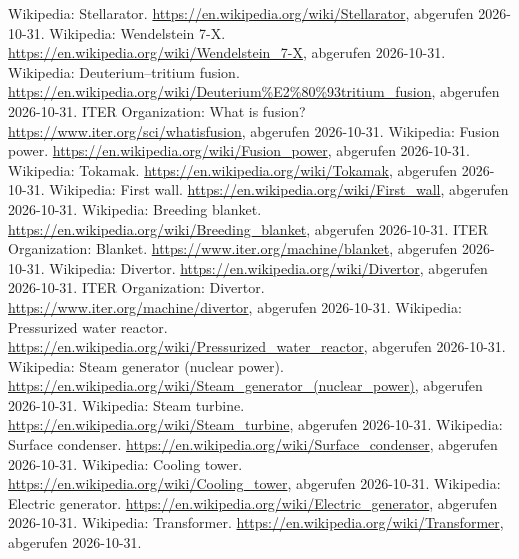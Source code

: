  Wikipedia: Stellarator. \url{https://en.wikipedia.org/wiki/Stellarator}, abgerufen 2026-10-31.
 Wikipedia: Wendelstein 7-X. \url{https://en.wikipedia.org/wiki/Wendelstein_7-X}, abgerufen 2026-10-31.
 Wikipedia: Deuterium--tritium fusion. \url{https://en.wikipedia.org/wiki/Deuterium%E2%80%93tritium_fusion}, abgerufen 2026-10-31.
 ITER Organization: What is fusion? \url{https://www.iter.org/sci/whatisfusion}, abgerufen 2026-10-31.
 Wikipedia: Fusion power. \url{https://en.wikipedia.org/wiki/Fusion_power}, abgerufen 2026-10-31.
 Wikipedia: Tokamak. \url{https://en.wikipedia.org/wiki/Tokamak}, abgerufen 2026-10-31.
 Wikipedia: First wall. \url{https://en.wikipedia.org/wiki/First_wall}, abgerufen 2026-10-31.
 Wikipedia: Breeding blanket. \url{https://en.wikipedia.org/wiki/Breeding_blanket}, abgerufen 2026-10-31.
 ITER Organization: Blanket. \url{https://www.iter.org/machine/blanket}, abgerufen 2026-10-31.
 Wikipedia: Divertor. \url{https://en.wikipedia.org/wiki/Divertor}, abgerufen 2026-10-31.
 ITER Organization: Divertor. \url{https://www.iter.org/machine/divertor}, abgerufen 2026-10-31.
 Wikipedia: Pressurized water reactor. \url{https://en.wikipedia.org/wiki/Pressurized_water_reactor}, abgerufen 2026-10-31.
 Wikipedia: Steam generator (nuclear power). \url{https://en.wikipedia.org/wiki/Steam_generator_(nuclear_power)}, abgerufen 2026-10-31.
 Wikipedia: Steam turbine. \url{https://en.wikipedia.org/wiki/Steam_turbine}, abgerufen 2026-10-31.
 Wikipedia: Surface condenser. \url{https://en.wikipedia.org/wiki/Surface_condenser}, abgerufen 2026-10-31.
 Wikipedia: Cooling tower. \url{https://en.wikipedia.org/wiki/Cooling_tower}, abgerufen 2026-10-31.
 Wikipedia: Electric generator. \url{https://en.wikipedia.org/wiki/Electric_generator}, abgerufen 2026-10-31.
 Wikipedia: Transformer. \url{https://en.wikipedia.org/wiki/Transformer}, abgerufen 2026-10-31.
